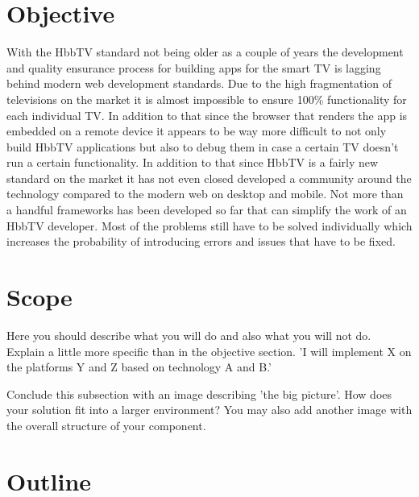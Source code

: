 \section{Objective\label{sec:objective}}

With the HbbTV standard not being older as a couple of years the development and quality ensurance process for
building apps for the smart TV is lagging behind modern web development standards. Due to the high fragmentation
of televisions on the market it is almost impossible to ensure 100\% functionality for each individual TV.
In addition to that since the browser that renders the app is embedded on a remote device it appears to be
way more difficult to not only build HbbTV applications but also to debug them in case a certain TV doesn't
run a certain functionality. In addition to that since HbbTV is a fairly new standard on the market it has not
even closed developed a community around the technology compared to the modern web on desktop and mobile. Not
more than a handful frameworks has been developed so far that can simplify the work of an HbbTV developer. Most
of the problems still have to be solved individually which increases the probability of introducing errors and
issues that have to be fixed.\\


\section{Scope\label{sec:scope}}

Here you should describe what you will do and also what you will not do. Explain a little
more specific than in the objective section. 'I will implement X on the platforms Y and Z
based on technology A and B.'

Conclude this subsection with an image describing 'the big picture'. How does your solution
fit into a larger environment? You may also add another image with the overall structure of
your component.

\section{Outline\label{sec:outline}}

